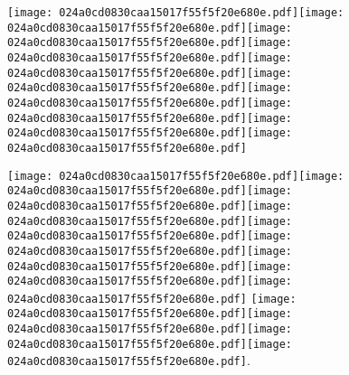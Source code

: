 \documentclass{article}
\newcommand{\origpg}[2]{\texttt{[image: 024a0cd0830caa15017f55f5f20e680e.pdf]}}
\begin{document}
{\origpg{14}{472.86pt 513.26pt 481.08pt 529.4pt}\hspace{-0.258pt}\origpg{14}{480.82pt 513.26pt 487.99pt 529.4pt}\hspace{0.291pt}\origpg{14}{488.28pt 513.26pt 496.33pt 529.4pt}\origpg{14}{496.24pt 513.26pt 503.6pt 529.4pt}\origpg{14}{503.69pt 513.26pt 512.33pt 529.4pt}\origpg{14}{512.33pt 513.26pt 519.49pt 529.4pt}\hspace{-0.145pt}\origpg{14}{519.35pt 513.26pt 527.98pt 529.4pt}\hspace{-0.21pt}\origpg{14}{527.77pt 513.26pt 540.2pt 529.4pt}\origpg{14}{540.28pt 513.26pt 547.45pt 529.4pt}\hspace{-0.178pt}\origpg{14}{547.27pt 513.26pt 554.44pt 529.4pt} 

\vspace{0.626pt}\hspace{18.094pt}\origpg{14}{103.4pt 493.26pt 112.03pt 509.4pt}\origpg{14}{112.03pt 493.26pt 120.1pt 509.4pt}\origpg{14}{120.02pt 493.26pt 127.64pt 509.4pt}\origpg{14}{127.72pt 493.26pt 134.89pt 509.4pt}\hspace{-0.42pt}\origpg{14}{134.47pt 493.26pt 142.68pt 509.4pt}\origpg{14}{142.68pt 493.26pt 149.85pt 509.4pt}\hspace{-0.21pt}\origpg{14}{149.64pt 493.26pt 158.27pt 509.4pt}\origpg{14}{158.27pt 493.26pt 166.91pt 509.4pt}\origpg{14}{166.97pt 493.26pt 174.14pt 509.4pt} \origpg{14}{178.05pt 493.26pt 184.66pt 509.4pt}\hspace{-0.113pt}\origpg{14}{184.55pt 493.26pt 191.72pt 509.4pt}\origpg{14}{191.76pt 493.26pt 198.14pt 509.4pt}\hspace{-0.113pt}\origpg{14}{198.03pt 493.26pt 205.19pt 509.4pt}. 

}
\end{document}
